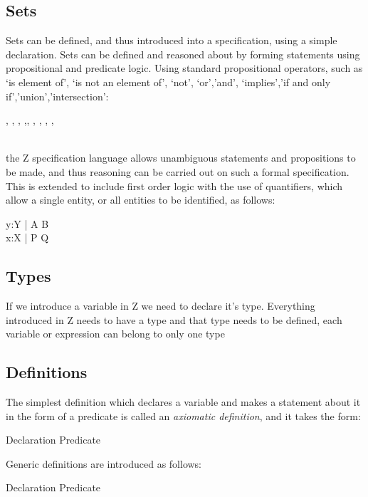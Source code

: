 \documentclass{llncs}
\begin{document}
\subsection{Sets}
Sets can be defined, and thus introduced into a specification, using a simple declaration. Sets can be defined and reasoned about by forming statements using propositional and predicate logic. Using standard propositional operators, such as `is element of', `is not an element of', `not', `or','and', `implies','if and only if','union','intersection': \begin{zed}\in, \notin, \lnot, \lor,\land, \implies, \iff, \cup, \cap,  \end{zed}\\ the Z specification language allows unambiguous statements and propositions to be made, and thus reasoning can be carried out on such a formal specification. This is extended to include first order logic with the use of quantifiers, which allow a single entity, or all entities to be identified, as follows: \begin{zed}  \exists y:Y | A \spot B \\ \forall x:X | P \spot Q   \end{zed}

\subsection{Types}

If we introduce a variable in Z we need to declare it's type. Everything introduced in Z needs to have a type and that type needs to be defined, each variable or expression can belong to only one type

\subsection{Definitions}
The simplest definition which declares a variable and makes a statement about it in the form of a predicate is called an \emph{axiomatic definition}, and it takes the form:

	\begin{axdef}
	Declaration
	\where
	Predicate
	\end{axdef}

Generic definitions are introduced as follows:

\begin{gendef}[Params]
	Declaration
	\where
	Predicate
\end{gendef}
\end{document}
